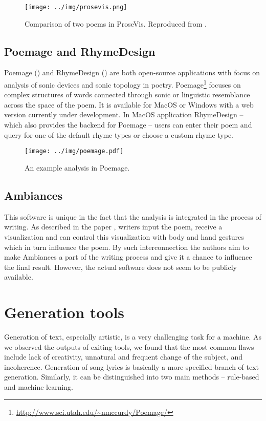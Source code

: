 \begin{figure}[h]\centering
	\texttt{[image: ../img/prosevis.png]}
	\caption[Comparison of two poems in ProseVis]{Comparison of two poems in ProseVis. Reproduced from \cite{prosevis2017sourceforge}.}\label{screenshotProsevis}
\end{figure}

\subsection*{Poemage and RhymeDesign}
Poemage (\cite{McCurdy2015poemage}) and RhymeDesign (\cite{McCurdy2015}) are both open-source applications with focus on analysis of sonic devices and sonic topology in poetry. Poemage\footnote{\url{http://www.sci.utah.edu/~nmccurdy/Poemage/}} focuses on complex structures of words connected through sonic or linguistic resemblance across the space of the poem. It is available for MacOS or Windows with a web version currently under development. In MacOS application RhymeDesign -- which also provides the backend for Poemage -- users can enter their poem and query for one of the default rhyme types or choose a custom rhyme type.

\begin{figure}[h]\centering
	\texttt{[image: ../img/poemage.pdf]}
	\caption{An example analysis in Poemage.}\label{screenshotPoemage}
\end{figure}

\subsection*{Ambiances}
This software is unique in the fact that the analysis is integrated in the process of writing. As described in the paper \cite{Meneses2015}, writers input the poem, receive a visualization and can control this visualization with body and hand gestures which in turn influence the poem. By such interconnection the authors aim to make Ambiances a part of the writing process and give it a chance to influence the final result. However, the actual software does not seem to be publicly available.


\section{Generation tools}\label{generation_tools}

Generation of text, especially artistic, is a very challenging task for a machine. As we observed the outputs of exiting tools, we found that the most common flaws include lack of creativity, unnatural and frequent change of the subject, and incoherence. Generation of song lyrics is basically a more specified branch of text generation. Similarly, it can be distinguished into two main methods -- rule-based and machine learning. 

